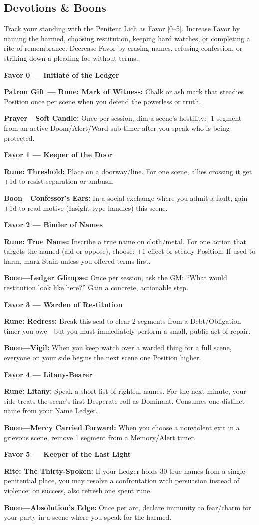 \documentclass[18pt, letterpaper, twoside]{article}
\newcommand{\devotion}[2]{\noindent\textbf{Favor #1 --- #2}\par}
\newcommand{\rite}[2]{\noindent\textbf{#1:} #2\par}
\begin{document}
\subsection{Devotions \& Boons}

Track your standing with the Penitent Lich as Favor [0--5]. Increase Favor by naming the harmed, choosing restitution, keeping hard watches, or completing a rite of remembrance. Decrease Favor by erasing names, refusing confession, or striking down a pleading foe without terms.

\devotion{0}{Initiate of the Ledger}
\rite{Patron Gift --- Rune: Mark of Witness}{Chalk or ash mark that steadies Position once per scene when you defend the powerless or truth.}
\rite{Prayer---Soft Candle}{Once per session, dim a scene's hostility: -1 segment from an active Doom/Alert/Ward sub-timer after you speak who is being protected.}

\devotion{1}{Keeper of the Door}
\rite{Rune: Threshold}{Place on a doorway/line. For one scene, allies crossing it get +1d to resist separation or ambush.}
\rite{Boon---Confessor's Ears}{In a social exchange where you admit a fault, gain +1d to read motive (Insight-type handles) this scene.}

\devotion{2}{Binder of Names}
\rite{Rune: True Name}{Inscribe a true name on cloth/metal. For one action that targets the named (aid or oppose), choose: +1 effect or steady Position. If used to harm, mark Stain unless you offered terms first.}
\rite{Boon---Ledger Glimpse}{Once per session, ask the GM: ``What would restitution look like here?'' Gain a concrete, actionable step.}

\devotion{3}{Warden of Restitution}
\rite{Rune: Redress}{Break this seal to clear 2 segments from a Debt/Obligation timer you owe---but you must immediately perform a small, public act of repair.}
\rite{Boon---Vigil}{When you keep watch over a warded thing for a full scene, everyone on your side begins the next scene one Position higher.}

\devotion{4}{Litany-Bearer}
\rite{Rune: Litany}{Speak a short list of rightful names. For the next minute, your side treats the scene's first Desperate roll as Dominant. Consumes one distinct name from your Name Ledger.}
\rite{Boon---Mercy Carried Forward}{When you choose a nonviolent exit in a grievous scene, remove 1 segment from a Memory/Alert timer.}

\devotion{5}{Keeper of the Last Light}
\rite{Rite: The Thirty-Spoken}{If your Ledger holds 30 true names from a single penitential place, you may resolve a confrontation with persuasion instead of violence; on success, also refresh one spent rune.}
\rite{Boon---Absolution's Edge}{Once per arc, declare immunity to fear/charm for your party in a scene where you speak for the harmed.}
\end{document}
